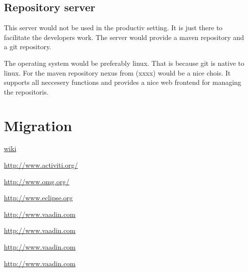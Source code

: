 \documentclass[paper=a4,twoside=false,BCOR=0mm,DIV=calc,fontsize=12pt]{scrartcl}
\begin{document}
\subsection{Repository server}
This server would not be used in the productiv setting. It is just there to facilitate the developers work.
The server would provide a maven repository and a git repository. 

The operating system would be preferably linux. That is because git is native to linux.
For the maven repository nexus from (xxxx) would be a nice chois. It supports all neccesery functions and provides a nice web frontend for managing the repositoris.






\section{Migration}








\begin{thebibliography}{99}

 \url{wiki}

 \url{http://www.activiti.org/}

 \url{http://www.omg.org/}

 \url{http://www.eclipse.org} %

 \url{http://www.vaadin.com}

 \url{http://www.vaadin.com}

 \url{http://www.vaadin.com}

 \url{http://www.vaadin.com}

 \url{} %


 \url{}

 \url{}

 \url{}

 \url{}

 \url{}

 \url{}

 \url{}

 \url{}

 \url{}

 \url{}


\end{thebibliography}
\end{document}
